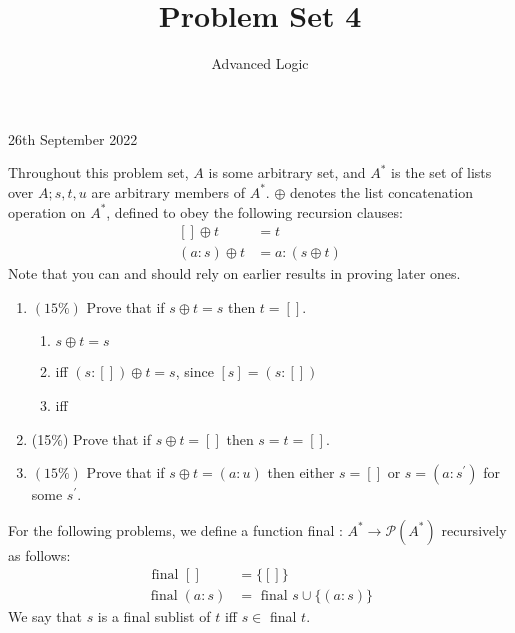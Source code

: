 \documentclass[10pt]{article}
\title{Problem Set 4 }
\author{Advanced Logic}
\date{}
\begin{document}
\maketitle

26th September 2022

Throughout this problem set, $A$ is some arbitrary set, and $A^{*}$ is the set of lists over $A ; s, t, u$ are arbitrary members of $A^{*}$. $\oplus$ denotes the list concatenation operation on $A^{*}$, defined to obey the following recursion clauses:
$$
\begin{aligned}
{[] \oplus t } &=t \\
(a: s) \oplus t &=a:(s \oplus t)
\end{aligned}
$$
Note that you can and should rely on earlier results in proving later ones.

\begin{enumerate}
  \item $(15 \%)$ Prove that if $s \oplus t=s$ then $t=[]$.
    \begin{enumerate}
        \item $s \oplus t = s$
        \item iff $(s:[]) \oplus t = s$, since $[s] = (s:[])$ 
        \item iff 
    \end{enumerate}
  \item (15\%) Prove that if $s \oplus t=[]$ then $s=t=[]$.

  \item $(15 \%)$ Prove that if $s \oplus t=(a: u)$ then either $s=[]$ or $s=\left(a: s^{\prime}\right)$ for some $s^{\prime}$.

\end{enumerate}
For the following problems, we define a function final : $A^{*} \rightarrow \mathcal{P}\left(A^{*}\right)$ recursively as follows:
$$
\begin{aligned}
\text { final }[] &=\{[]\} \\
\operatorname{final}(a: s) &=\text { final } s \cup\{(a: s)\}
\end{aligned}
$$
We say that $s$ is a final sublist of $t$ iff $s \in$ final $t$.
\end{document}
